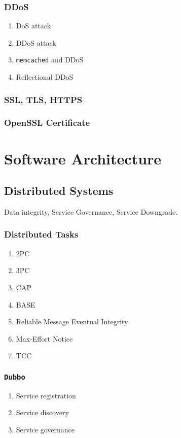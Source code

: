 \documentclass[11pt, twocolumn]{article}
\begin{document}
\subsubsection{DDoS}
\begin{enumerate}
	\item DoS attack
	\item DDoS attack
	\item \texttt{memcached} and DDoS
	\item Reflectional DDoS
\end{enumerate}

\subsubsection{SSL, TLS, HTTPS}

\subsubsection{OpenSSL Certificate}

\section{Software Architecture}

\subsection{Distributed Systems}
Data integrity, Service Governance, Service Downgrade.

\subsubsection{Distributed Tasks}
\begin{enumerate}
	\item 2PC
	\item 3PC
	\item CAP
	\item BASE
	\item Reliable Message Eventual Integrity
	\item Max-Effort Notice
	\item TCC
\end{enumerate}

\subsubsection{\texttt{Dubbo}}
\begin{enumerate}
	\item Service registration
	\item Service discovery
	\item Service governance
\end{enumerate}
\end{document}
